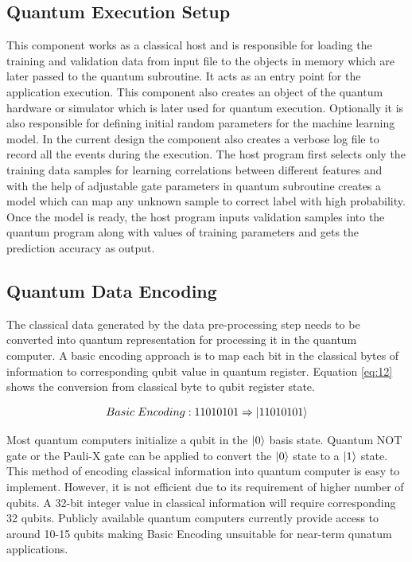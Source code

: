 \documentclass[english,a4paper,11pt,oneside,onecolumn]{book}
\begin{document}
\subsection{Quantum Execution Setup}
This component works as a classical host and is responsible for loading the training and validation data from input file to the objects in memory which are later passed to the quantum subroutine. It acts as an entry point for the application execution. This component also creates an object of the quantum hardware or simulator which is later used for quantum execution. Optionally it is also responsible for defining initial random parameters for the machine learning model. In the current design the component also creates a verbose log file to record all the events during the execution. The host program first selects only the training data samples for learning correlations between different features and with the help of adjustable gate parameters in quantum subroutine creates a model which can map any unknown sample to correct label with high probability. Once the model is ready, the host program inputs validation samples into the quantum program along with values of training parameters and gets the prediction accuracy as output.

\subsection{Quantum Data Encoding}
The classical data generated by the data pre-processing step needs to be converted into quantum representation for processing it in the quantum computer. A basic encoding approach is to map each bit in the classical bytes of information to corresponding qubit value in quantum register. Equation \ref{eq:12} shows the conversion from classical byte to qubit register state.

\begin{equation}\label{eq:12}
    Basic\hspace{3pt}Encoding: 11010101 \Rightarrow \ket{11010101}
\end{equation}

Most quantum computers initialize a qubit in the $\ket{0}$ basis state. Quantum NOT gate or the Pauli-X gate can be applied to convert the $\ket{0}$ state to a $\ket{1}$ state. This method of encoding classical information into quantum computer is easy to implement. However, it is not efficient due to its requirement of higher number of qubits. A 32-bit integer value in classical information will require corresponding 32 qubits. Publicly available quantum computers currently provide access to around 10-15 qubits making Basic Encoding unsuitable for near-term qunatum applications.
\end{document}
